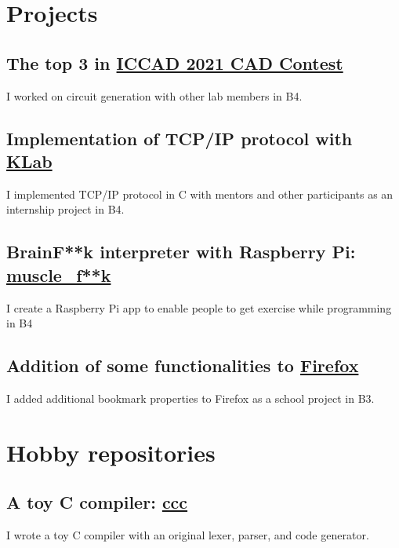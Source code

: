 \documentclass[12pt]{article}
\begin{document}
\section*{Projects}
  \subsection*{The top 3 in \href{http://iccad-contest.org/2021/}{ICCAD 2021 CAD Contest}}
    I worked on circuit generation with other lab members in B4.
  \subsection*{Implementation of TCP/IP protocol with \href{https://www.klab.com/en/}{KLab}}
    I implemented TCP/IP protocol in C with mentors and other participants as an internship project in B4.
  \subsection*{BrainF**k interpreter with Raspberry Pi: \href{https://github.com/diohabara/muscle_fuck}{muscle\_f**k}}
    I create a Raspberry Pi app to enable people to get exercise while programming in B4
  \subsection*{Addition of some functionalities to \href{https://slides.com/diohabara/deck}{Firefox}}
    I added additional bookmark properties to Firefox as a school project in B3.

\section*{Hobby repositories}
  \subsection*{A toy C compiler: \href{https://github.com/diohabara/ccc}{ccc}}
    I wrote a toy C compiler with an original lexer, parser, and code generator.
\end{document}

